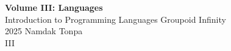 \documentclass{article}
\begin{document}
\begin{titlepage}
    \centering
    \vspace*{1in}
    \Huge
    \textbf{Volume III: Languages} \\
    \vspace{0.5in}
    \Large
    Introduction to Programming Languages
    \vfill
    \Large
    Groupoid Infinity \\
    \vspace{0.2in}
2025
    \vspace{0.5in}
    \vspace{0.5in}
    \Large
    Namdak Tonpa \\
    III
\end{titlepage}


\tableofcontents
\newif\ifincludeTOC
\includeTOCfalse
\newpage \begin{standalone}     \end{standalone}
\newpage \begin{standalone}   \end{standalone}
\newpage \begin{standalone}  \end{standalone}
\newpage \begin{standalone}  \end{standalone}
\end{document}
